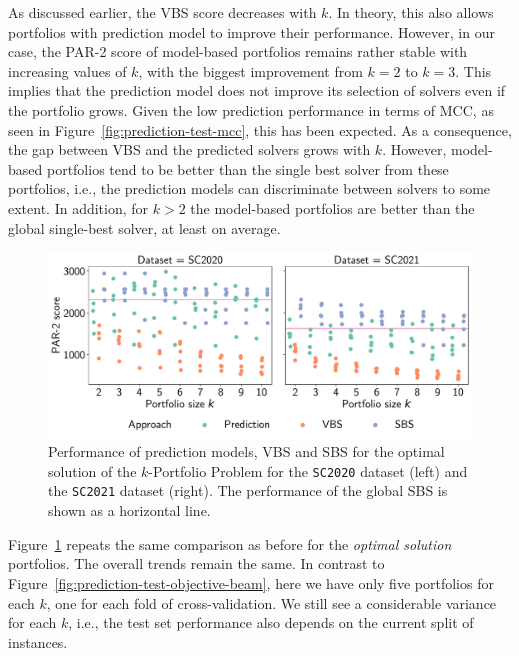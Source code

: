 \documentclass[a4paper,USenglish,pdfa]{lipics-v2021} %
\begin{document}
As discussed earlier, the VBS score decreases with $k$.
In theory, this also allows portfolios with prediction model to improve their performance.
However, in our case, the \mbox{PAR-2} score of model-based portfolios remains rather stable with increasing values of $k$, with the biggest improvement from $k=2$ to $k=3$.
This implies that the prediction model does not improve its selection of solvers even if the portfolio grows.
Given the low prediction performance in terms of MCC, as seen in Figure~\ref{fig:prediction-test-mcc}, this has been expected.
As a consequence, the gap between VBS and the predicted solvers grows with $k$.
However, model-based portfolios tend to be better than the single best solver from these portfolios, i.e., the prediction models can discriminate between solvers to some extent.
In addition, for $k > 2$ the model-based portfolios are better than the global single-best solver, at least on average.

\begin{figure}[htb]
	\centering
	\includegraphics[width=\columnwidth]{plots/prediction-test-objective-optimal.pdf}
	\caption{
		Performance of prediction models, VBS and SBS for the optimal solution of the $k$-Portfolio Problem for the \texttt{SC2020} dataset (left) and the \texttt{SC2021} dataset (right).
		The performance of the global SBS is shown as a horizontal line.
	}
	\label{fig:prediction-test-objective-optimal}
\end{figure}

Figure~\ref{fig:prediction-test-objective-optimal} repeats the same comparison as before for the \emph{optimal solution} portfolios.
The overall trends remain the same.
In contrast to Figure~\ref{fig:prediction-test-objective-beam}, here we have only five portfolios for each $k$, one for each fold of cross-validation.
We still see a considerable variance for each $k$, i.e., the test set performance also depends on the current split of instances.
\end{document}
